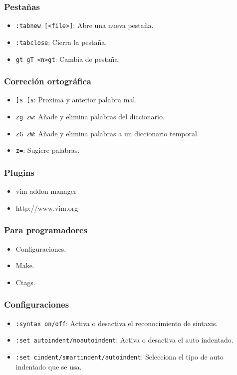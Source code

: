 \documentclass[10pt]{beamer}
\begin{document}
  \begin{frame}[containsverbatim]
    \frametitle{Pestañas}
    \begin{itemize}
      \item \verb+:tabnew [<file>]+: Abre una nueva pestaña.
      \item \verb+:tabclose+: Cierra la pestaña.
      \item \verb+gt gT <n>gt+: Cambia de pestaña.
    \end{itemize}
  \end{frame}

  \begin{frame}[containsverbatim]
    \frametitle{Correción ortográfica}
    \begin{itemize}
      \item \verb+]s [s+: Proxima y anterior palabra mal.
      \item \verb+zg zw+: Añade y elimina palabras del diccionario.
      \item \verb+zG zW+: Añade y elimina palabras a un diccionario temporal.
      \item \verb+z=+: Sugiere palabras.
    \end{itemize}
  \end{frame}
  
  \begin{frame}[containsverbatim]
    \frametitle{Plugins}
    \begin{itemize}
      \item vim-addon-manager
      \item http://www.vim.org
    \end{itemize}
  \end{frame}
  
  
  \begin{frame}[containsverbatim]
    \frametitle{Para programadores}
    \begin{itemize}
      \item Configuraciones.
      \item Make.
      \item Ctags.
    \end{itemize}
  \end{frame}
  
  \begin{frame}[containsverbatim]
    \frametitle{Configuraciones}
    \begin{itemize}
      \item \verb+:syntax on/off+: Activa o desactiva el reconocimiento de sintaxis.
      \item \verb+:set autoindent/noautoindent+: Activa o desactiva el auto indentado.
      \item \verb+:set cindent/smartindent/autoindent+: Selecciona el tipo de auto indentado que se usa.
    \end{itemize}
  \end{frame}
  
\end{document}
